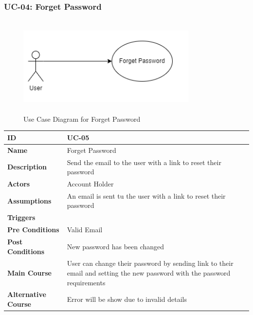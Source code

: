     \subsubsection{UC-04: Forget Password}
    \begin{figure}[H]
        \includegraphics[height=5cm, width=0.8\textwidth]{./diagrams/Use Case/u4.png}
        \centering 
        \caption{Use Case Diagram for Forget Password}
        \label{fig: Usecase1}
        \end{figure}
        
    \begin{center}
        \begin{tabularx}{\textwidth}{|l|X|}
            \hline
            \textbf{ID} & UC-05 \\
            \hline
            \textbf{Name} & Forget Password \\
            \hline
            \textbf{Description} & Send the email to the user with a link to reset their password \\
            \hline
            \textbf{Actors} & Account Holder \\
            \hline
            \textbf{Assumptions} & An email is sent tu the user with a link to reset their password \\
            \hline
            \textbf{Triggers} &  \\
            \hline
            \textbf{Pre Conditions} & Valid Email \\
            \hline
            \textbf{Post Conditions} & New password has been changed \\
            \hline
            \textbf{Main Course} & User can change their password by sending link to their email and setting the new password with the password requirements \\
            \hline
            \textbf{Alternative Course} & Error will be show due to invalid details \\
            \hline
            
        \end{tabularx}
    \end{center}
    \newpage
    

